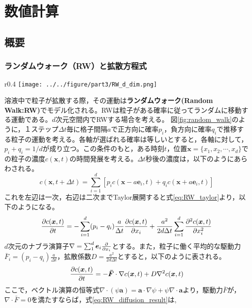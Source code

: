 \documentclass[autodetect-engine,dvi=dvipdfmx,a4paper,ja=standard,oneside,openany,11pt,draft]{bxjsbook}
\begin{document}
\chapter{数値計算}
\section{概要}
\subsection{ランダムウォーク（RW）と拡散方程式}
\label{sec:RW}
\begin{wrapfigure}{r}{0.4\textwidth}
  \centering
  \texttt{[image: ../../figure/part3/RW\_d\_dim.png]}
  \caption{ランダムウォークの模式図}
  \label{fig:random_walk}
\end{wrapfigure}
溶液中で粒子が拡散する際，その運動は\textbf{ランダムウォーク(Random Walk:RW)}でモデル化される。RWは粒子がある確率に従ってランダムに移動する運動である。$d$次元空間内でRWする場合を考える。
図\ref{fig:random_walk}のように，１ステップ$\Delta t$毎に格子間隔$a$で正方向に確率$p_i$，負方向に確率$q_i$で推移する粒子の運動を考える。各軸が選ばれる確率は等しいとすると，各軸に対して，$p_i+q_i=1/d$が成り立つ。この条件のもと，ある時刻$t$，位置$\bm{x}=\{x_1,x_2,\cdots,x_d\}$での粒子の濃度$c(\bm{x},t)$の時間発展を考える。$\Delta t$秒後の濃度は，以下のようにあらわされる。
\begin{equation}
  c(\bm{x},t+\Delta t)=\sum_{i=1}^{d}\left[p_i c(\bm{x}-a\bm{e}_i,t)+q_i c(\bm{x}+a\bm{e}_i,t)\right]
  \label{eq:RW}
\end{equation}
これを左辺は一次，右辺は二次までTaylor展開すると式\ref{eq:RW_taylor}より，以下のようになる。
\begin{equation}
  \pdv{c(\bm{x},t)}{t}=-\sum_{i=1}^{d}(p_i-q_i)\frac{a}{\Delta t}\pdv{c(\bm{x},t)}{x_i}+\frac{a^2}{2d\Delta t}\sum_{i=1}^{d}\pdv[2]{c(\bm{x},t)}{x_i}
  \label{eq:RW_diffusion}
\end{equation}
$d$次元のナブラ演算子$\nabla=\sum_{1}^{d}\bm{e}_i\pdv*{}{x_i}$とする。また，粒子に働く平均的な駆動力$\bar{F}_i=(p_i-q_i)\frac{a}{\Delta t}$，拡散係数$D=\frac{a^2}{2d\Delta t}$とすると，以下のように表される。
\begin{equation}
  \pdv{c(\bm{x},t)}{t}=-\bm{\bar{F}}\cdot\nabla c(\bm{x},t)+D\nabla^2 c(\bm{x},t)
  \label{eq:RW_diffusion_result}
\end{equation}
ここで，ベクトル演算の恒等式$\nabla\cdot(\psi\bm{a})=\bm{a}\cdot\nabla\psi+\psi\nabla\cdot\bm{a}$より，駆動力$\bar{F}$が，$\nabla\cdot\bar{F}=0$を満たすならば，式\ref{eq:RW_diffusion_result}は,
\end{document}
